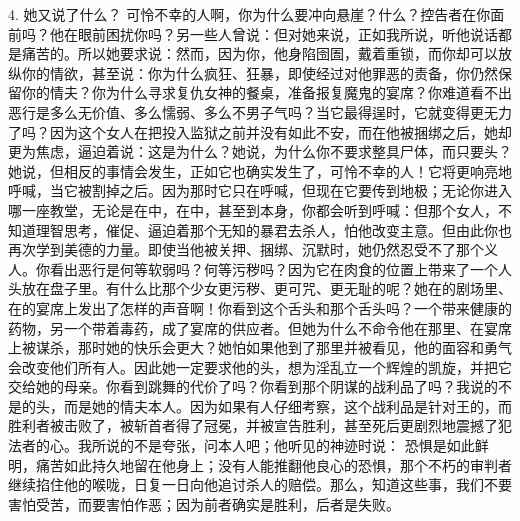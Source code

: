 4. 她又说了什么？ 可怜不幸的人啊，你为什么要冲向悬崖？什么？控告者在你面前吗？他在眼前困扰你吗？另一些人曾说：但对她来说，正如我所说，听他说话都是痛苦的。所以她要求说：然而，因为你，他身陷囹圄，戴着重锁，而你却可以放纵你的情欲，甚至说：你为什么疯狂、狂暴，即使经过对他罪恶的责备，你仍然保留你的情夫？你为什么寻求复仇女神的餐桌，准备报复魔鬼的宴席？你难道看不出恶行是多么无价值、多么懦弱、多么不男子气吗？当它最得逞时，它就变得更无力了吗？因为这个女人在把投入监狱之前并没有如此不安，而在他被捆绑之后，她却更为焦虑，逼迫着说：这是为什么？她说，为什么你不要求整具尸体，而只要头？她说，但相反的事情会发生，正如它也确实发生了，可怜不幸的人！它将更响亮地呼喊，当它被割掉之后。因为那时它只在呼喊，但现在它要传到地极；无论你进入哪一座教堂，无论是在中，在中，甚至到本身，你都会听到呼喊：但那个女人，不知道理智思考，催促、逼迫着那个无知的暴君去杀人，怕他改变主意。但由此你也再次学到美德的力量。即使当他被关押、捆绑、沉默时，她仍然忍受不了那个义人。你看出恶行是何等软弱吗？何等污秽吗？因为它在肉食的位置上带来了一个人头放在盘子里。有什么比那个少女更污秽、更可咒、更无耻的呢？她在的剧场里、在的宴席上发出了怎样的声音啊！你看到这个舌头和那个舌头吗？一个带来健康的药物，另一个带着毒药，成了宴席的供应者。但她为什么不命令他在那里、在宴席上被谋杀，那时她的快乐会更大？她怕如果他到了那里并被看见，他的面容和勇气会改变他们所有人。因此她一定要求他的头，想为淫乱立一个辉煌的凯旋，并把它交给她的母亲。你看到跳舞的代价了吗？你看到那个阴谋的战利品了吗？我说的不是的头，而是她的情夫本人。因为如果有人仔细考察，这个战利品是针对王的，而胜利者被击败了，被斩首者得了冠冕，并被宣告胜利，甚至死后更剧烈地震撼了犯法者的心。我所说的不是夸张，问本人吧；他听见的神迹时说： 恐惧是如此鲜明，痛苦如此持久地留在他身上；没有人能推翻他良心的恐惧，那个不朽的审判者继续掐住他的喉咙，日复一日向他追讨杀人的赔偿。那么，知道这些事，我们不要害怕受苦，而要害怕作恶；因为前者确实是胜利，后者是失败。\par

